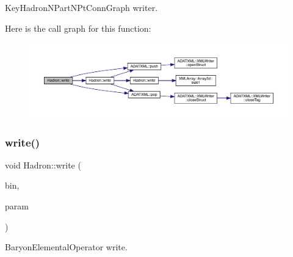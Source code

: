 Key\+Hadron\+N\+Part\+N\+Pt\+Conn\+Graph writer. 

Here is the call graph for this function\+:
\nopagebreak
\begin{figure}[H]
\begin{center}
\leavevmode
\includegraphics[width=350pt]{d1/daf/namespaceHadron_a25da56def6a3cbbe579c9b7b4d27e848_cgraph}
\end{center}
\end{figure}
\mbox{\label{namespaceHadron_a6ba238c6945bb5d95ae189cfee93a690}} 
\subsubsection{\texorpdfstring{write()}{write()}\hspace{0.1cm}{\footnotesize\ttfamily [69/95]}}
{\footnotesize\ttfamily void Hadron\+::write (\begin{DoxyParamCaption}\item[{\mbox{\hyperlink{classADATIO_1_1BinaryWriter}{Binary\+Writer}} \&}]{bin,  }\item[{const \mbox{\hyperlink{structHadron_1_1ValBaryonElementalOperator__t}{Val\+Baryon\+Elemental\+Operator\+\_\+t}} \&}]{param }\end{DoxyParamCaption})}



Baryon\+Elemental\+Operator write. 

